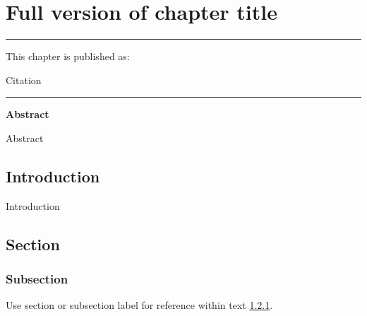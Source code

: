 
\chapter[Short version of title for header]{Full version of chapter title} %

% 

\label{Chapter3} %



\noindent \rule{\textwidth}{0.4pt}

\medskip

\noindent This chapter is published as:

\medskip

\noindent \hangindent=0.6cm Citation



\noindent\rule{\textwidth}{0.4pt}

\bigskip


\noindent \textbf{Abstract}

\medskip

\noindent
Abstract

\bigskip

\begin{multicols}{2}


\section{Introduction}

Introduction

\section{Section}

\subsection{Subsection}
\label{subsec:subsectionname3}

Use section or subsection label for reference within text \ref{subsec:subsectionname3}.



\end{multicols}
